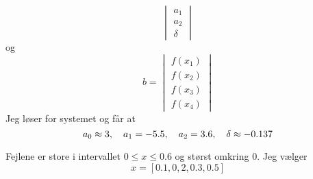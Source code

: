 \begin{Opgaver}
\begin{kapitel}
\begin{Opgave}
\begin{UnderOpgave}[Choose an initial set of m + 2 = 4 nodes \text{$\left[\zeta_{k}\right]_{k=0}^{3}$} as 0, 1/3, 2/3, and 1, ...]
\[\begin{vmatrix}
                    a_1 \\
                    a_2 \\
                    \delta 
                \end{vmatrix}\]
                og 
                \[b = 
                \begin{vmatrix}
                    f(x_1) \\
                    f(x_2) \\
                    f(x_3) \\
                    f(x_4) 
                \end{vmatrix}\]
                Jeg løser for systemet og får at 
                \[a_0 \approx 3, \tab{0} a_1 = -5.5, \tab{0} a_2 = 3.6, \tab{0} \delta \approx -0.137\]
            \end{UnderOpgave}
            \begin{UnderOpgave}
                Fejlene er store i intervallet $0 \leq x \leq 0.6$ og størst omkring 0. 
                Jeg vælger 
                \[x = [0.1, 0,2, 0.3, 0.5]\]
                

\end{UnderOpgave}
\end{Opgave}
\end{kapitel}
\end{Opgaver}

